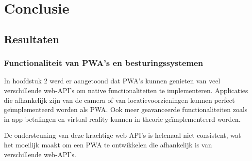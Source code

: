 
\chapter{Conclusie}
\label{ch:conclusie}



	  

\section{Resultaten}
	\subsection{Functionaliteit van PWA's en besturingssystemen}
	
		In hoofdstuk 2 werd er aangetoond dat PWA's kunnen genieten van veel verschillende web-API's om native functionaliteiten te implementeren. Applicaties die afhankelijk zijn van de camera of van locatievoorzieningen kunnen perfect geïmplementeerd worden als PWA. Ook meer geavanceerde functionaliteiten zoals in app betalingen en virtual reality kunnen in theorie geïmplementeerd worden.
		
		De ondersteuning van deze krachtige web-API's is helemaal niet consistent, wat het moeilijk maakt om een PWA te ontwikkelen die afhankelijk is van verschillende web-API's. 
		
